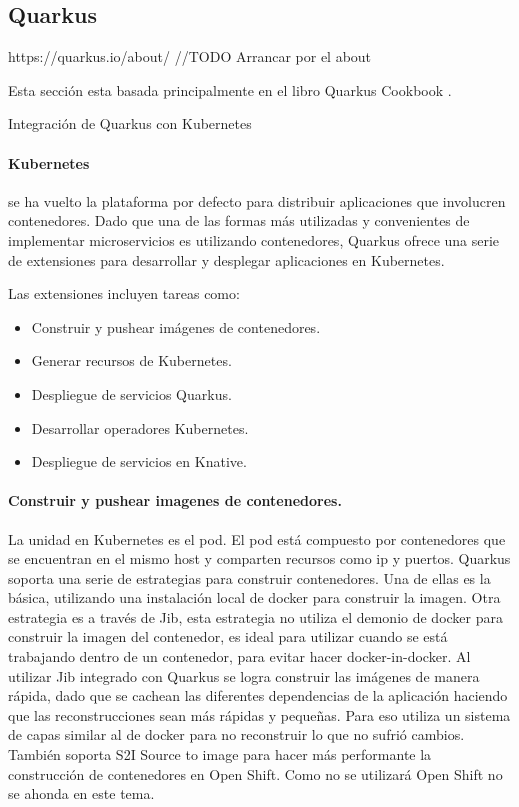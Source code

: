 \subsection{Quarkus}


https://quarkus.io/about/   //TODO  Arrancar por el about


Esta sección esta basada principalmente en el libro Quarkus Cookbook \cite{bueno_quarkus_nodate}.\par

Integración de Quarkus con Kubernetes

\paragraph{Kubernetes} se ha vuelto la plataforma por defecto para distribuir aplicaciones que involucren contenedores.
Dado que una de las formas más utilizadas y convenientes de implementar microservicios es utilizando contenedores, Quarkus ofrece una serie de extensiones para desarrollar y desplegar aplicaciones en Kubernetes.\par
Las extensiones incluyen tareas como:
\begin{itemize}
  \item Construir y pushear imágenes de contenedores.
  \item Generar recursos de Kubernetes.
  \item Despliegue de servicios Quarkus.
  \item Desarrollar operadores Kubernetes.
  \item Despliegue de servicios en Knative.
\end{itemize}

\paragraph{Construir y pushear imagenes de contenedores.}
La unidad en Kubernetes es el pod. El pod está compuesto por contenedores que se encuentran en el mismo host y comparten recursos como ip y puertos. Quarkus soporta una serie de estrategias para construir contenedores. Una de ellas es la básica, utilizando una instalación local de  docker para construir la imagen. Otra estrategia es a través de Jib, esta estrategia no utiliza el demonio de docker para construir la imagen del contenedor, es ideal para utilizar cuando se está trabajando dentro de un contenedor, para evitar hacer docker-in-docker. Al utilizar Jib integrado con Quarkus se logra construir las imágenes de manera rápida, dado que se cachean las diferentes dependencias de la aplicación haciendo que las reconstrucciones sean más rápidas y pequeñas. Para eso utiliza un sistema de capas similar al de docker para no reconstruir lo que no sufrió cambios. También soporta S2I Source to image para hacer más performante la construcción de contenedores en Open Shift. Como no se utilizará Open Shift no se ahonda en este tema.\par

